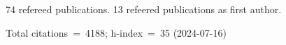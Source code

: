 74 refereed publications. 13 refeered publications as first author.

Total citations~=~4188; h-index~=~35 (2024-07-16)